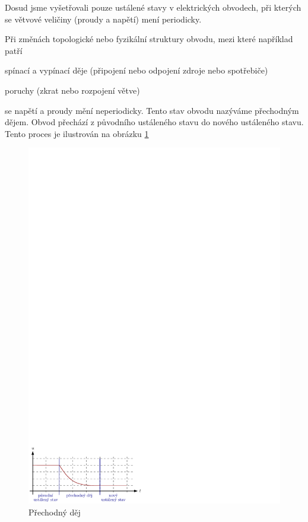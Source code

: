 Dosud jsme vyšetřovali pouze ustálené stavy v elektrických obvodech, při kterých se větvové veličiny (proudy a napětí) mení periodicky.

Při změnách topologické nebo fyzikální struktury obvodu, mezi které například patří
\begin{itemize*}
\item spínací a vypínací děje (připojení nebo odpojení zdroje nebo spotřebiče)
\item poruchy (zkrat nebo rozpojení větve)
\end{itemize*}
se napětí a proudy mění neperiodicky. Tento stav obvodu nazýváme přechodným dějem. Obvod přechází z původního ustáleného stavu do nového ustáleného stavu. Tento proces je ilustrován na obrázku \ref{fig:prechodny_dej}
\begin{figure}[h!]
\centering
\includegraphics[]{prechodne_jevy/prechodny_dej.pdf}
\caption{Přechodný děj}
\label{fig:prechodny_dej}
\end{figure}

